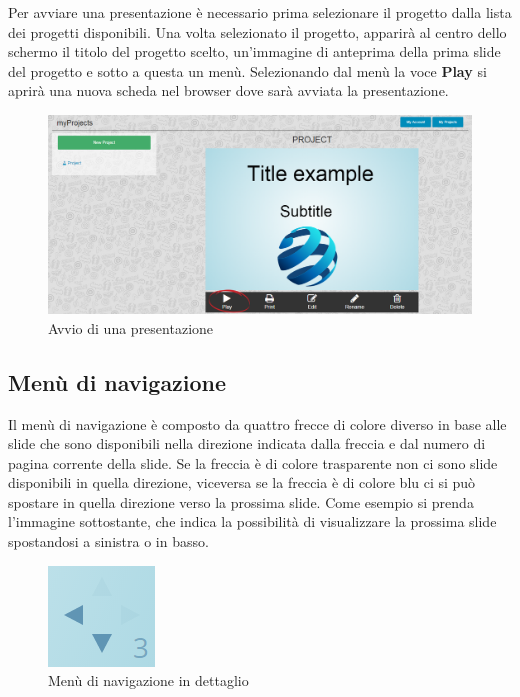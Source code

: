 Per avviare una presentazione è necessario prima selezionare il progetto dalla lista dei progetti disponibili. Una volta selezionato il progetto, apparirà al centro dello schermo il titolo del progetto scelto, un'immagine di anteprima della prima slide del progetto e sotto a questa un menù. Selezionando dal menù la voce \textbf{Play} si aprirà una nuova scheda nel browser dove sarà avviata la presentazione.

\begin{figure}[H] 
	\centering 
	\includegraphics[scale=0.40] {img/avv_pres.png}
	\caption{Avvio di una presentazione} 
\end{figure}

\subsection{Menù di navigazione}
\noindent Il menù di navigazione è composto da quattro frecce di colore diverso in base alle slide che sono disponibili nella direzione indicata dalla freccia e dal numero di pagina corrente della slide. Se la freccia è di colore trasparente non ci sono slide disponibili in quella direzione, viceversa se la freccia è di colore blu ci si può spostare in quella direzione verso la prossima slide. Come esempio si prenda l'immagine sottostante, che indica la possibilità di visualizzare la prossima slide spostandosi a sinistra o in basso.

\begin{figure}[H] 
	\centering 
	\includegraphics[scale=0.70] {img/nav.png}
	\caption{Menù di navigazione in dettaglio} 
	\end{figure}

